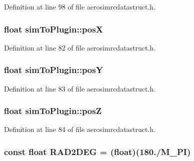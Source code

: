 \-Definition at line 98 of file aerosimrcdatastruct.\-h.

\hypertarget{group___aero_sim_r_c_gadc6f34115ac3890af669c35382d62882}{
\subsubsection[{pos\-X}]{\setlength{\rightskip}{0pt plus 5cm}float {\bf sim\-To\-Plugin\-::pos\-X}}}\label{group___aero_sim_r_c_gadc6f34115ac3890af669c35382d62882}


\-Definition at line 82 of file aerosimrcdatastruct.\-h.

\hypertarget{group___aero_sim_r_c_ga55c533e8057bdcc0bb7e95440eb82ff5}{
\subsubsection[{pos\-Y}]{\setlength{\rightskip}{0pt plus 5cm}float {\bf sim\-To\-Plugin\-::pos\-Y}}}\label{group___aero_sim_r_c_ga55c533e8057bdcc0bb7e95440eb82ff5}


\-Definition at line 83 of file aerosimrcdatastruct.\-h.

\hypertarget{group___aero_sim_r_c_gab66796c7082a7d42685f8c8c3b282c43}{
\subsubsection[{pos\-Z}]{\setlength{\rightskip}{0pt plus 5cm}float {\bf sim\-To\-Plugin\-::pos\-Z}}}\label{group___aero_sim_r_c_gab66796c7082a7d42685f8c8c3b282c43}


\-Definition at line 84 of file aerosimrcdatastruct.\-h.

\hypertarget{group___aero_sim_r_c_gabb429aecc5bba8de3564e19ded7ef104}{
\subsubsection[{\-R\-A\-D2\-D\-E\-G}]{\setlength{\rightskip}{0pt plus 5cm}const float {\bf \-R\-A\-D2\-D\-E\-G} = (float)(180./\-M\-\_\-\-P\-I)}}\label{group___aero_sim_r_c_gabb429aecc5bba8de3564e19ded7ef104}


